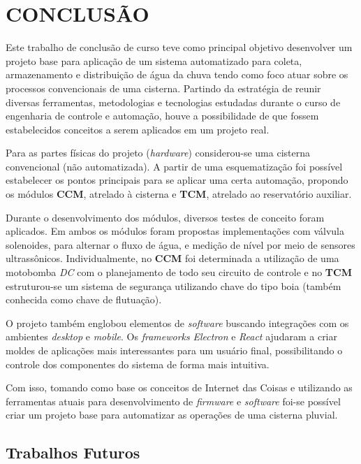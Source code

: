 
\chapter{CONCLUSÃO}
\label{chap:conclusao}

Este trabalho de conclusão de curso teve como principal objetivo desenvolver um projeto base para aplicação de um sistema automatizado para coleta, armazenamento e distribuição de água da chuva tendo como foco atuar sobre os processos convencionais de uma cisterna. Partindo da estratégia de reunir diversas ferramentas, metodologias e tecnologias estudadas durante o curso de engenharia de controle e automação, houve a possibilidade de que fossem estabelecidos conceitos a serem aplicados em um projeto real.

Para as partes físicas do projeto (\textit{hardware}) considerou-se uma cisterna convencional (não automatizada). A partir de uma esquematização foi possível estabelecer os pontos principais para se aplicar uma certa automação, propondo os módulos \textbf{CCM}, atrelado à cisterna e \textbf{TCM}, atrelado ao reservatório auxiliar.

Durante o desenvolvimento dos módulos, diversos testes de conceito foram aplicados. Em ambos os módulos foram propostas implementações com válvula solenoides, para alternar o fluxo de água, e medição de nível por meio de sensores ultrassônicos. Individualmente, no \textbf{CCM} foi determinada a utilização de uma motobomba \textit{DC} com o planejamento de todo seu circuito de controle e no \textbf{TCM} estruturou-se um sistema de segurança utilizando chave do tipo boia (também conhecida como chave de flutuação).

O projeto também englobou elementos de \textit{software} buscando integrações com os ambientes \textit{desktop} e \textit{mobile}. Os \textit{frameworks} \textit{Electron} e \textit{React} ajudaram a criar moldes de aplicações mais interessantes para um usuário final, possibilitando o controle dos componentes do sistema de forma mais intuitiva.

Com isso, tomando como base os conceitos de Internet das Coisas e utilizando as ferramentas atuais para desenvolvimento de \textit{firmware} e \textit{software} foi-se possível criar um projeto base para automatizar as operações de uma cisterna pluvial.

\section{Trabalhos Futuros}
\label{sec:trabalhosFuturos}

